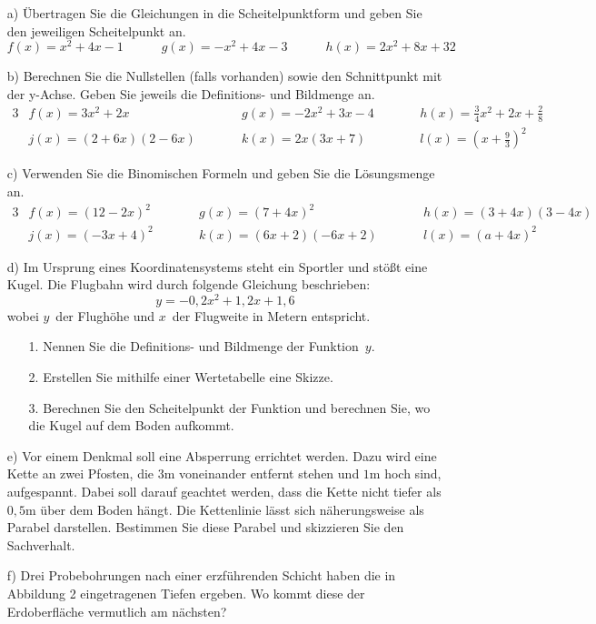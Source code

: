 	\begin{itemize}
		\item[a)] Übertragen Sie die Gleichungen in die Scheitelpunktform und geben Sie den jeweiligen Scheitelpunkt an.
		\begin{equation*}
			f(x) = x^2 + 4x - 1 \quad \qquad g(x) = -x^2 + 4x - 3 \qquad \quad h(x) = 2x^2 + 8x + 32
		\end{equation*}
		\item[b)] Berechnen Sie die Nullstellen (falls vorhanden) sowie den Schnittpunkt mit der y-Achse. Geben Sie jeweils die Definitions- und Bildmenge an.
		\begin{alignat*}{3}
			&f(x)=3x^2 + 2x &&g(x)=-2x^2 + 3x - 4 \qquad &&h(x) = \frac{3}{4} x^2 + 2x + \frac{2}{8}\\
			&j(x)= \left(2 + 6x\right) \left(2 - 6x\right) \qquad &&k(x)= 2x \left(3x + 7\right) &&l(x)= \left(x + \frac{9}{3}\right)^2
		\end{alignat*}
		\item[c)] Verwenden Sie die Binomischen Formeln und geben Sie die Lösungsmenge an.
		\begin{alignat*}{3}
			&f(x)= \left(12 - 2x\right)^2 &&g(x)= \left(7 + 4x\right)^2 &&h(x)= \left(3 + 4x\right)\left(3 - 4x\right)\\
			&j(x)= \left(-3x + 4\right)^2 \qquad&&k(x)= \left(6x + 2\right)\left(-6x+2\right) \qquad&&l(x)= \left(a + 4x\right)^2
		\end{alignat*}
		\item[d)] Im Ursprung eines Koordinatensystems steht ein Sportler und stößt eine Kugel. Die Flugbahn wird durch folgende Gleichung beschrieben:
		\begin{equation*}
			y= -0,2x^2 + 1,2x + 1,6
		\end{equation*}
		wobei $y$~der Flughöhe und $x$~der Flugweite in Metern entspricht.
		\begin{itemize}
			\item[1.] Nennen Sie die Definitions- und Bildmenge der Funktion~$y$.
			\item[2.] Erstellen Sie mithilfe einer Wertetabelle eine Skizze.
			\item[3.] Berechnen Sie den Scheitelpunkt der Funktion und berechnen Sie, wo die Kugel auf dem Boden aufkommt.
		\end{itemize}
		\item[e)] Vor einem Denkmal soll eine Absperrung errichtet werden. Dazu wird eine Kette an zwei Pfosten, die $3$m voneinander entfernt stehen und $1$m hoch sind, aufgespannt. Dabei soll darauf geachtet werden, dass die Kette nicht tiefer als $0,5$m über dem Boden hängt. Die Kettenlinie lässt sich näherungsweise als Parabel darstellen. Bestimmen Sie diese Parabel und skizzieren Sie den Sachverhalt.
		\item[f)] Drei Probebohrungen nach einer erzführenden Schicht haben die in Abbildung 2 eingetragenen Tiefen ergeben. Wo kommt diese der Erdoberfläche vermutlich am nächsten?
	\end{itemize}
